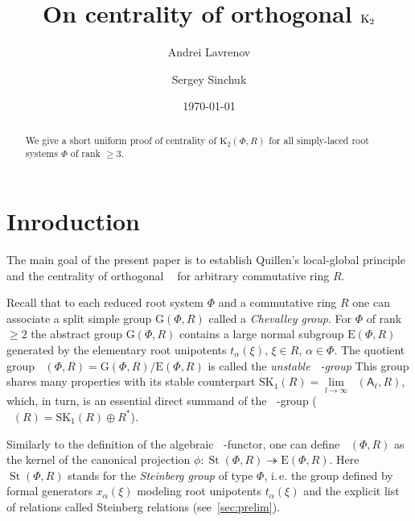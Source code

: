 \documentclass[11pt]{amsart}
\title{On centrality of orthogonal $\Kt$}
\author {Andrei Lavrenov}
\author{Sergey Sinchuk}
\date {\today}
\theoremstyle{plain} \declaretheorem[name=Theorem, Refname={Theorem,Theorems}]{tm} \Crefname{tm}{Theorem}{Theorems}
\numberwithin{equation}{section}
\theoremstyle{definition} \newtheorem{df}[lm]{Definition} \Crefname{df}{Definition}{Definitions}
\theoremstyle{remark} \newtheorem{rk}[lm]{Remark} \Crefname{rk}{Remark}{Remarks}
\newcommand{\E}{{\mathrm{E}}}
\newcommand{\GG}{{\mathrm{G}}}
\newcommand{\St}{\mathop{\mathrm{St}}\nolimits}
\newcommand{\Kt}{\mathop{\mathrm{K_2}}\nolimits}
\newcommand{\Ko}{\mathop{\mathrm{K_1}}\nolimits}
\newcommand{\rA}{\mathsf{A}}
\begin{document}
\begin{abstract} We give a short uniform proof of centrality of $\mathrm K_2(\Phi, R)$ for all simply-laced root systems $\Phi$ of rank $\geq 3$.
\end{abstract}

\maketitle


\section*{Inroduction}
The main goal of the present paper is to establish Quillen's local-global principle and the centrality of orthogonal $\Kt$ for arbitrary commutative ring $R$.

Recall that to each reduced root system $\Phi$ and a commutative ring $R$ one can associate a split simple group $\GG(\Phi, R)$ called a \emph{Chevalley group}.
For $\Phi$ of rank $\geq 2$ the abstract group $\GG(\Phi, R)$ contains a large normal subgroup $\E(\Phi, R)$ generated by the elementary root unipotents $t_\alpha(\xi)$, $\xi\in R$, $\alpha\in \Phi$.
The quotient group $\Ko(\Phi, R)=\GG(\Phi, R)/\E(\Phi, R)$ is called the \emph{unstable $\Ko$-group}
This group shares many properties with its stable counterpart $\mathrm{SK}_1(R) = \lim\limits_{l\to\infty}\Ko(\rA_\ell, R)$, which, in turn,
is an essential direct summand of the $\Ko$-group ($\Ko(R) = \mathrm{SK}_1(R) \oplus R^*$).

Similarly to the definition of the algebraic $\Kt$-functor, one can define $\Kt(\Phi, R)$ as the kernel of the canonical projection $\phi\colon\St(\Phi, R)\twoheadrightarrow \E(\Phi, R)$.
Here $\St(\Phi, R)$ stands for the \emph{Steinberg group} of type $\Phi$, i.\,e. the group defined by formal generators $x_\alpha(\xi)$ modeling root unipotents $t_\alpha(\xi)$
and the explicit list of relations called Steinberg relations (see~\cref{sec:prelim}). 
\end{document}
